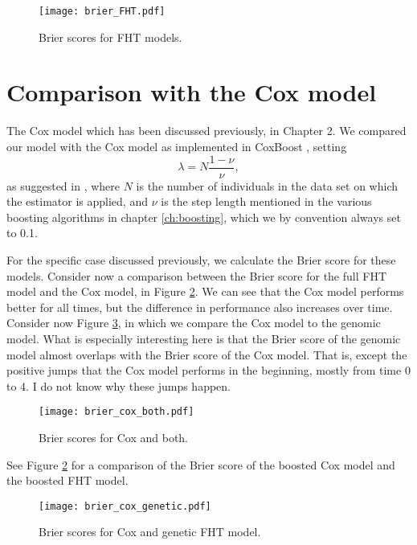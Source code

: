 \begin{figure}
\caption{Brier scores for FHT models.}
\label{fig:brier-FHT}
\centering\texttt{[image: brier\_FHT.pdf]}
\end{figure}

\section{Comparison with the Cox model}
The Cox model which has been discussed previously, in Chapter 2.
We compared our model with the Cox model as implemented in CoxBoost \citep{...}, setting
\begin{equation}\label{eq:lambda-nu}
    \lambda=N\frac{1-\nu}{\nu},
\end{equation}
as suggested in \citet{DeBin2016}, where $N$ is the number of individuals in the data set on which the estimator is applied, and $\nu$ is the step length mentioned in the various boosting algorithms in chapter \ref{ch:boosting}, which we by convention always set to 0.1.

For the specific case discussed previously, we calculate the Brier score for these models.
Consider now a comparison between the Brier score for the full FHT model and the Cox model, in Figure \ref{fig:brier-cox-both}.
We can see that the Cox model performs better for all times, but the difference in performance also increases over time.
Consider now Figure \ref{fig:brier-cox-genetic}, in which we compare the Cox model to the genomic model.
What is especially interesting here is that the Brier score of the genomic model almost overlaps with the Brier score of the Cox model.
That is, except the positive jumps that the Cox model performs in the beginning, mostly from time 0 to 4.
I do not know why these jumps happen.

\begin{figure}
\caption{Brier scores for Cox and both.}
\label{fig:brier-cox-both}
\centering\texttt{[image: brier\_cox\_both.pdf]}
\end{figure}
See Figure \ref{fig:brier-cox-both} for a comparison of the Brier score of the boosted Cox model and the boosted FHT model.
\begin{figure}
\caption{Brier scores for Cox and genetic FHT model.}
\label{fig:brier-cox-genetic}
\centering
\texttt{[image: brier\_cox\_genetic.pdf]}
\end{figure}


